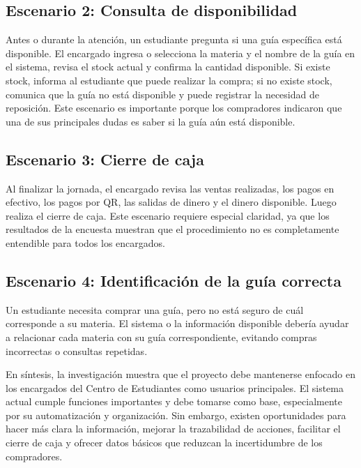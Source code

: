 \documentclass[12pt,letterpaper]{article}
\begin{document}
\subsection{Escenario 2: Consulta de disponibilidad}

Antes o durante la atención, un estudiante pregunta si una guía específica está disponible. El encargado ingresa o selecciona la materia y el nombre de la guía en el sistema, revisa el stock actual y confirma la cantidad disponible. Si existe stock, informa al estudiante que puede realizar la compra; si no existe stock, comunica que la guía no está disponible y puede registrar la necesidad de reposición. Este escenario es importante porque los compradores indicaron que una de sus principales dudas es saber si la guía aún está disponible.

\subsection{Escenario 3: Cierre de caja}

Al finalizar la jornada, el encargado revisa las ventas realizadas, los pagos en efectivo, los pagos por QR, las salidas de dinero y el dinero disponible. Luego realiza el cierre de caja. Este escenario requiere especial claridad, ya que los resultados de la encuesta muestran que el procedimiento no es completamente entendible para todos los encargados.

\subsection{Escenario 4: Identificación de la guía correcta}

Un estudiante necesita comprar una guía, pero no está seguro de cuál corresponde a su materia. El sistema o la información disponible debería ayudar a relacionar cada materia con su guía correspondiente, evitando compras incorrectas o consultas repetidas.

En síntesis, la investigación muestra que el proyecto debe mantenerse enfocado en los encargados del Centro de Estudiantes como usuarios principales. El sistema actual cumple funciones importantes y debe tomarse como base, especialmente por su automatización y organización. Sin embargo, existen oportunidades para hacer más clara la información, mejorar la trazabilidad de acciones, facilitar el cierre de caja y ofrecer datos básicos que reduzcan la incertidumbre de los compradores.
\end{document}
